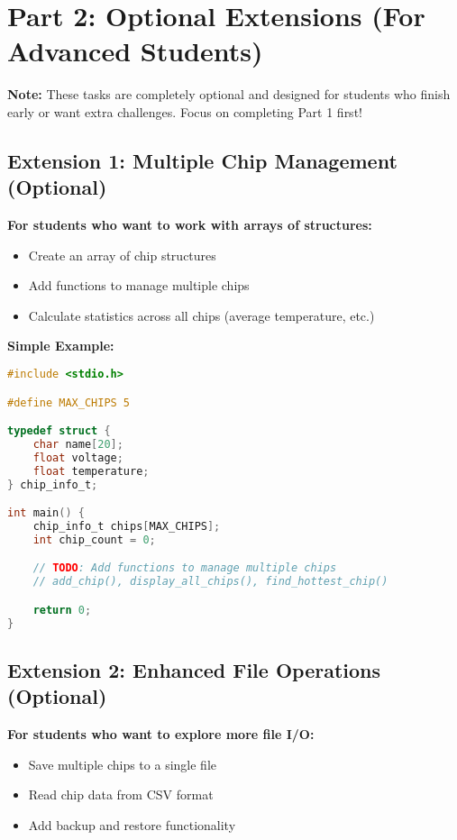 \documentclass[11pt,a4paper]{article}
\begin{document}
\section{Part 2: Optional Extensions (For Advanced Students)}

\textbf{Note:} These tasks are completely optional and designed for students who finish early or want extra challenges. Focus on completing Part 1 first!

\subsection{Extension 1: Multiple Chip Management (Optional)}

\textbf{For students who want to work with arrays of structures:}
\begin{itemize}
    \item Create an array of chip structures
    \item Add functions to manage multiple chips
    \item Calculate statistics across all chips (average temperature, etc.)
\end{itemize}

\textbf{Simple Example:}
\begin{lstlisting}[language=C]
#include <stdio.h>

#define MAX_CHIPS 5

typedef struct {
    char name[20];
    float voltage;
    float temperature;
} chip_info_t;

int main() {
    chip_info_t chips[MAX_CHIPS];
    int chip_count = 0;

    // TODO: Add functions to manage multiple chips
    // add_chip(), display_all_chips(), find_hottest_chip()

    return 0;
}
\end{lstlisting}

\subsection{Extension 2: Enhanced File Operations (Optional)}

\textbf{For students who want to explore more file I/O:}
\begin{itemize}
    \item Save multiple chips to a single file
    \item Read chip data from CSV format
    \item Add backup and restore functionality
\end{itemize}
\end{document}
